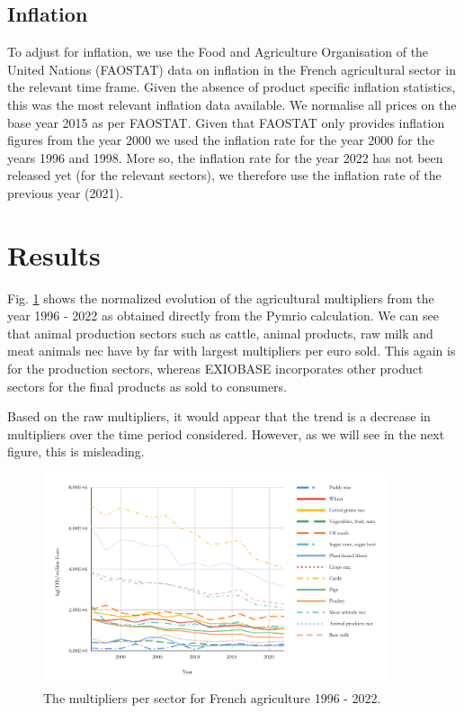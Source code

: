 \documentclass[a4paper,twoside]{article}
\begin{document}
\subsection{Inflation}

To adjust for inflation, we use the Food and Agriculture Organisation of the United Nations (FAOSTAT) data on inflation in the French agricultural sector in the relevant time frame. Given the absence of product specific inflation statistics, this was the most relevant inflation data available. We normalise all prices on the base year 2015 as per FAOSTAT. Given that FAOSTAT only provides inflation figures from the year 2000 we used the inflation rate for the year 2000 for the years 1996 and 1998. More so, the inflation rate for the year 2022 has not been released yet (for the relevant sectors), we therefore use the inflation rate of the previous year (2021).

\section{Results}

Fig. \ref{fig:rawmultipliers} shows the normalized evolution of the agricultural multipliers from the year 1996 - 2022 as obtained directly from the Pymrio calculation. We can see that animal production sectors such as cattle, animal products, raw milk and meat animals nec have by far with largest multipliers per euro sold. This again is for the production sectors, whereas EXIOBASE incorporates other product sectors for the final products as sold to consumers.

Based on the raw multipliers, it would appear that the trend is a decrease in multipliers over the time period considered. However, as we will see in the next figure, this is misleading.

\begin{figure}[H]
\centering
\includegraphics[width=0.9\textwidth]{raw_multipliers}
\caption{The multipliers per sector for French agriculture 1996 - 2022.}\label{fig:rawmultipliers} 
\end{figure}
\end{document}
